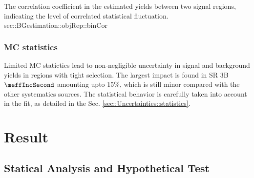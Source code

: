 {The correlation coefficient in the estimated yields between two signal regions, indicating the level of correlated statistical fluctuation.}
{sec::BGestimation::objRep::binCor}



\subsubsection{MC statistics}
Limited MC statictics lead to non-negligible uncertainty in signal and background yields in regions with tight selection. The largest impact is found in SR 3B $\meffIncSecond$ amounting upto $15\%$, which is still minor compared with the other systematics sources. The statistical behavior is carefully taken into account in the fit, as detailed in the Sec. \ref{sec::Uncertainties::statistics}.








\clearpage

\section{Result} 

\subsection{Statical Analysis and Hypothetical Test} \label{sec::Result::statistics}
